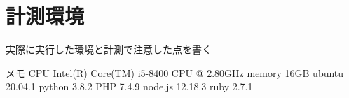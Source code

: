 \chapter{計測環境}
\label{cha:environment}
実際に実行した環境と計測で注意した点を書く

メモ
CPU Intel(R) Core(TM) i5-8400 CPU @ 2.80GHz
memory 16GB
ubuntu 20.04.1
python 3.8.2
PHP 7.4.9
node.js 12.18.3
ruby 2.7.1
